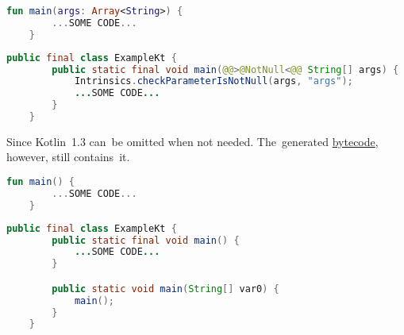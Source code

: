\begin{lstlisting}[language=Kotlin, title={A~standalone main function in a~file \textit{Example.kt}}]
    fun main(args: Array<String>) {
        ...SOME CODE...
    }
\end{lstlisting}

\begin{lstlisting}[language=Java, title={Corresponding Java code}]
    public final class ExampleKt {
        public static final void main(@@>@NotNull<@@ String[] args) {
            Intrinsics.checkParameterIsNotNull(args, "args");
            ...SOME CODE...
        }
    }
\end{lstlisting}
\newline

\noindent Since Kotlin~1.3  can~be omitted when not needed.
The~generated \hyperref[javabytecode]{bytecode}, however, still contains~it.

\begin{lstlisting}[language=Kotlin, title={A~standalone main function without \mbit{args}}]
    fun main() {
        ...SOME CODE...
    }
\end{lstlisting}

\begin{lstlisting}[language=Java, title={Corresponding Java code}]
    public final class ExampleKt {
        public static final void main() {
            ...SOME CODE...
        }

        public static void main(String[] var0) {
            main();
        }
    }
\end{lstlisting}
\newpage
